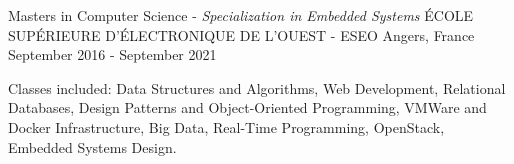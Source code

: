

\begin{cventries}

  \cventry
  {Masters in Computer Science - \textit{Specialization in Embedded Systems}} %
  {ÉCOLE SUPÉRIEURE D'ÉLECTRONIQUE DE L'OUEST - ESEO} %
  {Angers, France} %
  {September 2016 - September 2021} %
  {
    \begin{cvitems}
      \item Classes included: Data Structures and Algorithms, Web Development, Relational Databases, Design Patterns and Object-Oriented Programming, VMWare and Docker Infrastructure, Big Data, Real-Time Programming, OpenStack, Embedded Systems Design.
    \end{cvitems}
  }

\end{cventries}
